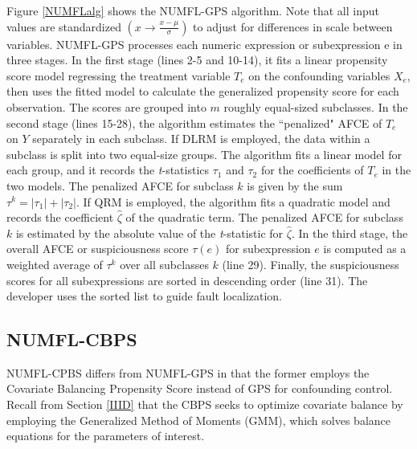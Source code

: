 Figure \ref{NUMFLalg} shows the NUMFL-GPS algorithm.  Note that all input values are standardized $(x \to \frac{{x - \mu }}{\sigma })$ to adjust for differences in scale between variables.  NUMFL-GPS processes each numeric expression or subexpression e in three stages.  In the first stage (lines 2-5 and 10-14), it fits a linear propensity score model regressing the treatment variable $T_e$ on the confounding variables $X_e$, then uses the fitted model to calculate the generalized propensity score for each observation.  The scores are grouped into $m$ roughly equal-sized subclasses.  In the second stage (lines 15-28), the algorithm estimates the ``penalized" AFCE of $T_e$ on $Y$ separately in each subclass.  If DLRM is employed, the data within a subclass is split into two equal-size groups.  The algorithm fits a linear model for each group, and it records the {\it t}-statistics ${\tau _1}$ and ${\tau _2}$ for the coefficients of $T_e$ in the two models.  The penalized AFCE for subclass $k$ is given by the sum ${\tau ^k} = |{\tau _1}| + \left| {{\tau _2}} \right|$.  If QRM is employed, the algorithm fits a quadratic model and records the coefficient ${\hat \zeta }$ of the quadratic term.  The penalized AFCE for subclass $k$ is estimated by the absolute value of the {\it t}-statistic for ${\hat \zeta }$.  In the third stage, the overall AFCE or suspiciousness score $\tau(e)$ for subexpression $e$ is computed as a weighted average of $\tau^k$ over all subclasses $k$ (line 29).  Finally, the suspiciousness scores for all subexpressions are sorted in descending order (line 31).  The developer uses the sorted list to guide fault localization.

\subsection{NUMFL-CBPS}\label{IVB}
NUMFL-CPBS differs from NUMFL-GPS in that the former employs the Covariate Balancing Propensity Score instead of GPS for confounding control.   Recall from Section \ref{IIID} that the CBPS seeks to optimize covariate balance by employing the Generalized Method of Moments (GMM), which solves balance equations for the parameters of interest.

